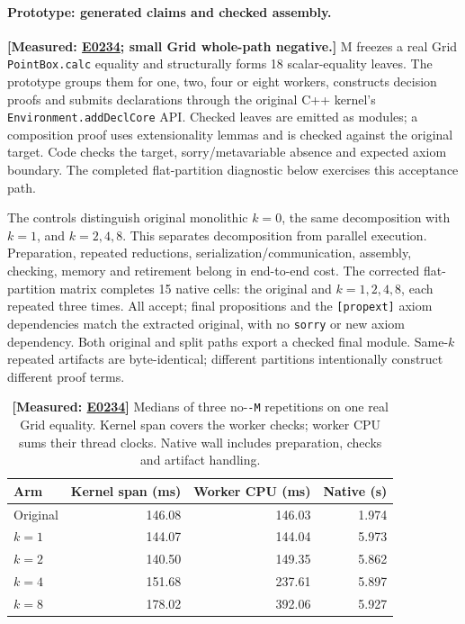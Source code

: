 \documentclass[10pt,twocolumn]{article}
\newcommand{\measured}[1]{\textbf{[Measured: #1]}}
\newcommand{\expref}[2]{\href{https://github.com/yunwei37/proofserve/blob/main/docs/tmp/build-and-evaluate/step-#1/step-report.md}{E#2}}
\begin{document}
\paragraph{Prototype: generated claims and checked assembly.}
\measured{\expref{0234-20261101T030854+0000}{0234}; small Grid whole-path negative.}
M freezes a real Grid \texttt{PointBox.calc} equality and structurally forms
18 scalar-equality leaves.
The prototype groups them for one, two, four or eight workers, constructs
decision proofs and submits declarations through the original C++ kernel's
\texttt{Environment.addDeclCore} API.
Checked leaves are emitted as modules; a composition proof uses
extensionality lemmas and is checked against the original target.
Code checks the target, sorry/metavariable absence and expected axiom boundary.
The completed flat-partition diagnostic below exercises this acceptance path.

The controls distinguish original monolithic $k=0$, the same decomposition
with $k=1$, and $k=2,4,8$.
This separates decomposition from parallel execution.
Preparation, repeated reductions, serialization/communication, assembly,
checking, memory and retirement belong in end-to-end cost.
The corrected flat-partition matrix completes 15 native cells:
the original and $k=1,2,4,8$, each repeated three times.
All accept; final propositions and the \texttt{[propext]} axiom dependencies
match the extracted original, with no \texttt{sorry} or new axiom dependency.
Both original and split paths export a checked final module.
Same-$k$ repeated artifacts are byte-identical; different partitions
intentionally construct different proof terms.

\begin{table}[t]
\centering\small\setlength{\tabcolsep}{3pt}
\begin{tabular}{lrrr}
\toprule
Arm & Kernel span (ms) & Worker CPU (ms) & Native (s)\\
\midrule
Original &146.08&146.03&1.974\\
$k=1$ &144.07&144.04&5.973\\
$k=2$ &140.50&149.35&5.862\\
$k=4$ &151.68&237.61&5.897\\
$k=8$ &178.02&392.06&5.927\\
\bottomrule
\end{tabular}
\caption{\measured{\expref{0234-20261101T030854+0000}{0234}} Medians of three no-\texttt{-M} repetitions on one real Grid
equality. Kernel span covers the worker checks; worker CPU sums their thread
clocks. Native wall includes preparation, checks and artifact handling.}
\label{tab:flat}
\end{table}
\end{document}
